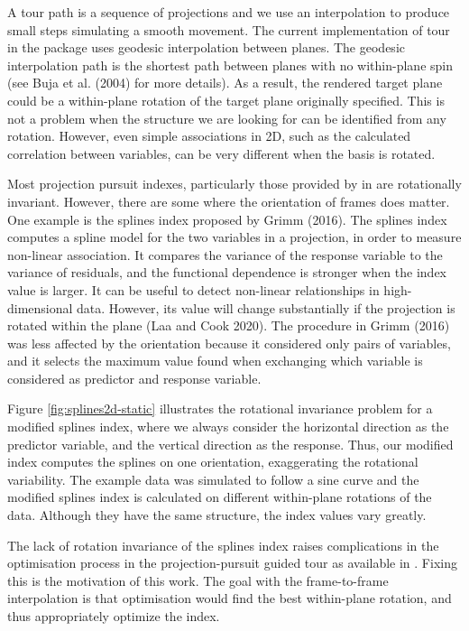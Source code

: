 A tour path is a sequence of projections and we use an interpolation to produce small steps simulating a smooth movement. The current implementation of tour in the  package uses geodesic interpolation between planes. The geodesic interpolation path is the shortest path between planes with no within-plane spin (see Buja et al. (2004) for more details). As a result, the rendered target plane could be a within-plane rotation of the target plane originally specified. This is not a problem when the structure we are looking for can be identified from any rotation. However, even simple associations in 2D, such as the calculated correlation between variables, can be very different when the basis is rotated.

Most projection pursuit indexes, particularly those provided by in  are rotationally invariant. However, there are some where the orientation of frames does matter. One example is the splines index proposed by Grimm (2016). The splines index computes a spline model for the two variables in a projection, in order to measure non-linear association. It compares the variance of the response variable to the variance of residuals, and the functional dependence is stronger when the index value is larger. It can be useful to detect non-linear relationships in high-dimensional data. However, its value will change substantially if the projection is rotated within the plane (Laa and Cook 2020). The procedure in Grimm (2016) was less affected by the orientation because it considered only pairs of variables, and it selects the maximum value found when exchanging which variable is considered as predictor and response variable.

Figure \ref{fig:splines2d-static} illustrates the rotational invariance problem for a modified splines index, where we always consider the horizontal direction as the predictor variable, and the vertical direction as the response. Thus, our modified index computes the splines on one orientation, exaggerating the rotational variability. The example data was simulated to follow a sine curve and the modified splines index is calculated on different within-plane rotations of the data. Although they have the same structure, the index values vary greatly.

The lack of rotation invariance of the splines index raises complications in the optimisation process in the projection-pursuit guided tour as available in . Fixing this is the motivation of this work. The goal with the frame-to-frame interpolation is that optimisation would find the best within-plane rotation, and thus appropriately optimize the index.

